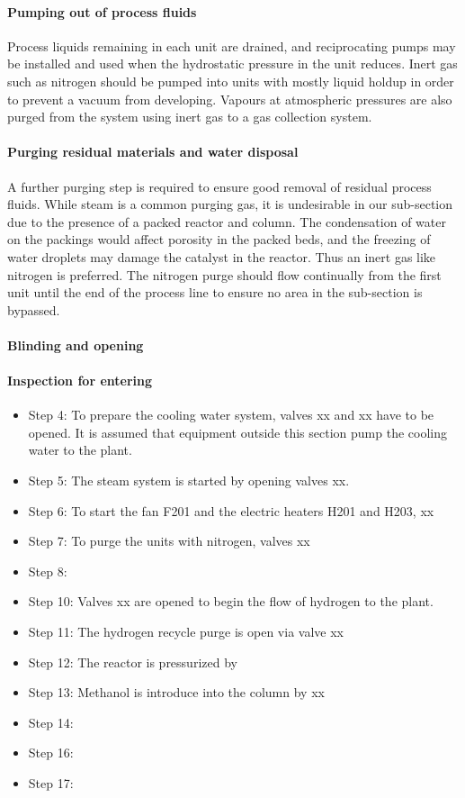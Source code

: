 \paragraph{Pumping out of process fluids}
Process liquids remaining in each unit are drained, and reciprocating pumps may be installed and used when the hydrostatic pressure in the unit reduces. Inert gas such as nitrogen should be pumped into units with mostly liquid holdup in order to prevent a vacuum from developing. Vapours at atmospheric pressures are also purged from the system using inert gas to a gas collection system.

\paragraph{Purging residual materials and water disposal}
A further purging step is required to ensure good removal of residual process fluids. While steam is a common purging gas, it is undesirable in our sub-section due to the presence of a packed reactor and column. The condensation of water on the packings would affect porosity in the packed beds, and the freezing of water droplets may damage the catalyst in the reactor. Thus an inert gas like nitrogen is preferred. The nitrogen purge should flow continually from the first unit until the end of the process line to ensure no area in the sub-section is bypassed.


\paragraph{Blinding and opening}

\paragraph{Inspection for entering}


\begin{itemize}
    \item Step 4: To prepare the cooling water system, valves xx and xx have to be opened. It is assumed that equipment outside this section pump the cooling water to the plant.
    \item Step 5: The steam system is started by opening valves xx.
    \item Step 6: To start the fan F201 and the electric heaters H201 and H203, xx
    \item Step 7: To purge the units with nitrogen, valves xx
    \item Step 8: 
    \item Step 10: Valves xx are opened to begin the flow of hydrogen to the plant.
    \item Step 11: The hydrogen recycle purge is open via valve xx
    \item Step 12: The reactor is pressurized by
    \item Step 13: Methanol is introduce into the column by xx
    \item Step 14:
    \item Step 16:
    \item Step 17:
\end{itemize}